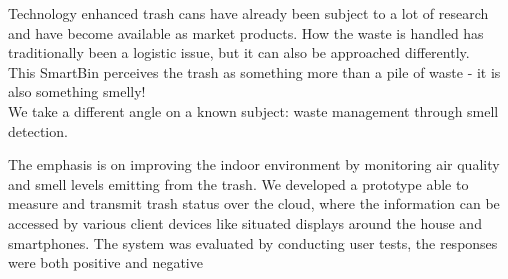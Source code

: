 Technology enhanced trash cans have already been subject to a lot of research and have become available as market products.
How the waste is handled has traditionally been a logistic issue, but it can also be approached differently.\\
This SmartBin perceives the trash as something more than a pile of waste - it is also something smelly!\\
We take a different angle on a known subject: waste management through smell detection.

The emphasis is on improving the indoor environment by monitoring air quality and smell levels emitting from the trash.
We developed a prototype able to measure and transmit trash status over the cloud, where the information can be accessed by various client devices like situated displays around the house and smartphones.
The system was evaluated by conducting user tests, the responses were both positive and negative